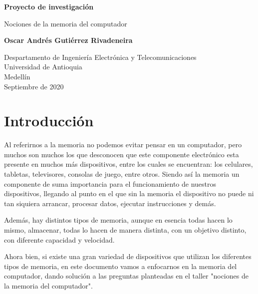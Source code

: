 \documentclass{article}
\begin{document}
\begin{titlepage}
    \begin{center}
        \vspace*{1cm}
            
        \Huge
        \textbf{Proyecto de investigación}
            
        \vspace{0.5cm}
        \LARGE
        Nociones de la memoria del computador
            
        \vspace{1.5cm}
            
        \textbf{Oscar Andrés Gutiérrez Rivadeneira}
            
        \vfill
            
        \vspace{0.8cm}
            
        \Large
        Despartamento de Ingeniería Electrónica y Telecomunicaciones\\
        Universidad de Antioquia\\
        Medellín\\
        Septiembre de 2020
            
    \end{center}
\end{titlepage}

\tableofcontents

\newpage

\section{Introducción}
Al referirnos a la memoria no podemos evitar pensar en un computador, pero muchos son muchos los que desconocen que este componente electrónico esta presente en muchos más dispositivos, entre los cuales se encuentran: los celulares, tabletas, televisores, consolas de juego, entre otros. Siendo así la memoria un componente de suma importancia para el funcionamiento de nuestros dispositivos, llegando al punto en el que sin la memoria el dispositivo no puede ni tan siquiera arrancar, procesar datos, ejecutar instrucciones y demás.\cite{tipos-memoria}

Además, hay distintos tipos de memoria, aunque en esencia todas hacen lo mismo, almacenar, todas lo hacen de manera distinta, con un objetivo distinto, con diferente capacidad y velocidad.\hfill
\vspace{4mm}

Ahora bien, si existe una gran variedad de dispositivos que utilizan los diferentes tipos de memoria, en este documento vamos a enfocarnos en la memoria del computador, dando solución a las preguntas planteadas en el taller "nociones de la memoria del computador".
\end{document}
